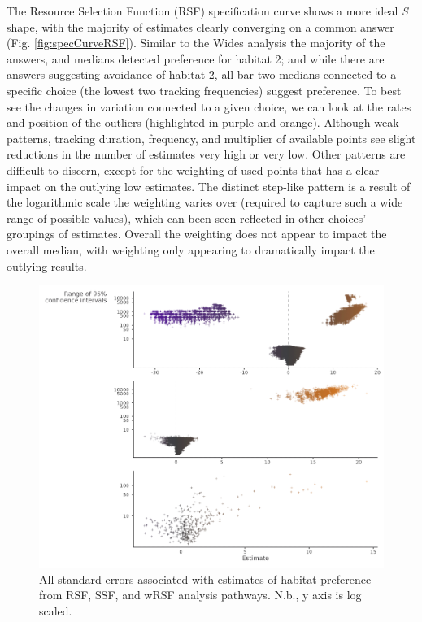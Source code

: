 \documentclass[10pt,a4paper]{article}
\begin{document}
The Resource Selection Function (RSF) specification curve shows a more ideal \emph{S} shape, with the majority of estimates clearly converging on a common answer (Fig. \ref{fig:specCurveRSF}).
Similar to the Wides analysis the majority of the answers, and medians detected preference for habitat 2; and while there are answers suggesting avoidance of habitat 2, all bar two medians connected to a specific choice (the lowest two tracking frequencies) suggest preference.
To best see the changes in variation connected to a given choice, we can look at the rates and position of the outliers (highlighted in purple and orange).
Although weak patterns, tracking duration, frequency, and multiplier of available points see slight reductions in the number of estimates very high or very low.
Other patterns are difficult to discern, except for the weighting of used points that has a clear impact on the outlying low estimates.
The distinct step-like pattern is a result of the logarithmic scale the weighting varies over (required to capture such a wide range of possible values), which can been seen reflected in other choices' groupings of estimates.
Overall the weighting does not appear to impact the overall median, with weighting only appearing to dramatically impact the outlying results.

\begin{figure}
\includegraphics[width=1\linewidth]{../figures/uncertaintyPlot} \caption{All standard errors associated with estimates of habitat preference from RSF, SSF, and wRSF analysis pathways. N.b., y axis is log scaled.}\label{fig:uncertaintyPlot}
\end{figure}
\end{document}
